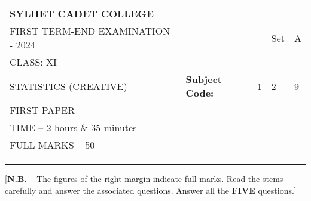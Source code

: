 \documentclass{article}
\begin{document}
\begin{table}[h]
\centering
\begin{tabular}{lllll}
\textbf{\large SYLHET CADET COLLEGE} &  &  &  &  \\ \cline{4-5} 
FIRST TERM-END EXAMINATION - 2024 &  & \multicolumn{1}{l|}{} & 
\multicolumn{1}{l|}{Set} & \multicolumn{1}{l|}{A} \\ \cline{4-5} 
CLASS: XI &  &  &  &  \\ \cline{3-5} 
STATISTICS (CREATIVE)& \multicolumn{1}{l|}{\textbf{Subject Code:}} & 
\multicolumn{1}{l|}{1} & \multicolumn{1}{l|}{2} & \multicolumn{1}{l|}{9} \\ \cline{3-5} 
 FIRST PAPER &  &  &  &  \\
TIME – 2 hours \& 35 minutes &  &  &  &  \\
FULL MARKS – 50 &  &  &  & 
\end{tabular}
\end{table}

\hrule

\begin{center}
[\textbf{N.B.} – The figures of the right margin indicate full marks. Read 
the stems carefully and answer the associated questions. Answer all the
\textbf{FIVE} questions.]\\
\end{center}

\end{document}
